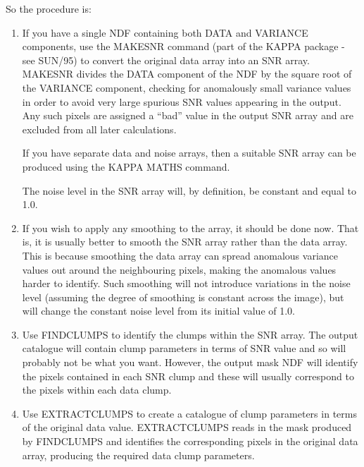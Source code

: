 \documentclass[twoside,11pt]{article}
\newcommand{\xref}[3]{#1}
\renewcommand{\_}{\texttt{\symbol{95}}}
\begin{document}
So the procedure is:
\begin{enumerate}

\item If you have a single NDF containing both DATA and VARIANCE
components, use the \xref{MAKESNR}{sun95}{MAKESNR} command (part of the 
KAPPA package - see \xref{SUN/95}{sun95}{}) to convert the original data 
array into an SNR array. MAKESNR divides the DATA component of the NDF by 
the square root of the VARIANCE component, checking for anomalously small 
variance values in order to avoid very large spurious SNR values appearing 
in the output. Any such pixels are assigned a ``bad'' value in the output 
SNR array and are excluded from all later calculations.

If you have separate data and noise arrays, then a suitable SNR array can
be produced using the KAPPA \xref{MATHS}{sun95}{MATHS} command.

The noise level in the SNR array will, by definition, be constant and
equal to 1.0.

\item If you wish to apply any smoothing to the array, it should be done now. 
That is, it is usually better to smooth the SNR array rather than the data
array. This is because smoothing the data array can spread anomalous
variance values out around the neighbouring pixels, making the anomalous
values harder to identify. Such smoothing will not introduce variations
in the noise level (assuming the degree of smoothing is constant across
the image), but will change the constant noise level from its initial
value of 1.0.

\item Use FINDCLUMPS to identify the clumps within the SNR array. The
output catalogue will contain clump parameters in terms of SNR value and
so will probably not be what you want. However, the output mask NDF will
identify the pixels contained in each SNR clump and these will usually 
correspond to the pixels within each data clump.

\item Use EXTRACTCLUMPS to create a catalogue of clump parameters in
terms of the original data value. EXTRACTCLUMPS reads in the mask produced
by FINDCLUMPS and identifies the corresponding pixels in the original
data array, producing the required data clump parameters.

\end{enumerate}



\newpage
\appendix
\end{document}
